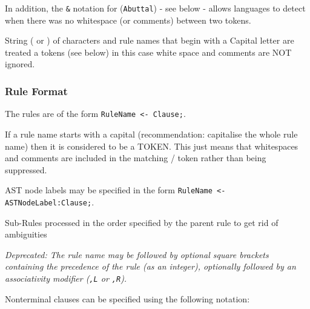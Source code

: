 In addition, the \texttt{\&\textbar{}} notation for (\texttt{Abuttal}) - see below - allows languages to detect when there was no whitespace (or comments) between two tokens.

String (\textquotedbl{} or \textquotesingle{}) of characters and rule names that begin with a Capital letter are treated a tokens (see below) in this case white space and comments are NOT ignored.

\subsubsection{Rule Format}

The rules are of the form \texttt{RuleName \textless{}- Clause;}.

If a rule name starts with a capital (recommendation: capitalise the whole rule name) then it is considered to be a TOKEN. This just means that whitespaces and comments are included in the matching / token rather than being suppressed.

AST node labels may be specified in the form \texttt{RuleName \textless{}- ASTNodeLabel:Clause;}.

Sub-Rules processed in the order specified by the parent rule to get rid of ambiguities

\emph{Deprecated: The rule name may be followed by optional square brackets containing the precedence of the
rule (as an integer), optionally followed by an associativity modifier (\texttt{,L} or \texttt{,R}).}

Nonterminal clauses can be specified using the following notation:


